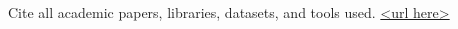 \cleardoublepage
{}
{}
\begin{thebibliography}{99}

Cite all academic papers, libraries, datasets, and tools used. \url{<url here>}

\end{thebibliography}
